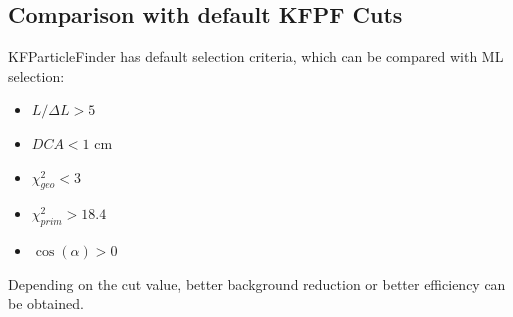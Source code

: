 \documentclass[12pt,a4paper]{report}
\begin{document}
\subsection{Comparison with default KFPF Cuts}
KFParticleFinder has default selection criteria, which can be compared with ML selection:
\begin{itemize}
    \item $L/\Delta L > 5 $
    \item $DCA < 1 $ cm
    \item $\chi^2_{geo} < 3 $
    \item $\chi^2_{prim} > 18.4 $
    \item $\cos(\alpha) > 0 $
\end{itemize}
Depending on the cut value,  better background reduction or better efficiency can be obtained.
\end{document}
